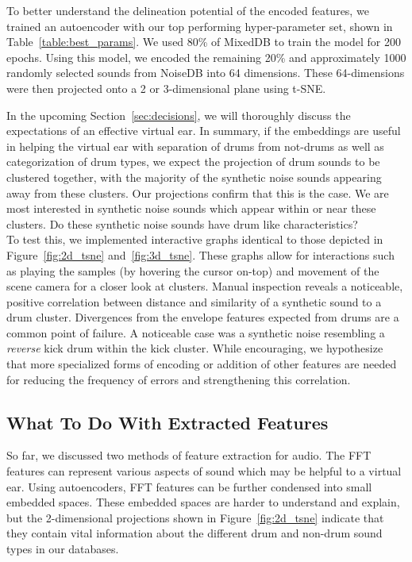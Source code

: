 \documentclass[\main/thesis.tex]{subfiles}
\begin{document}
To better understand the delineation potential of the encoded features,  we trained an autoencoder with our top performing hyper-parameter set, shown in Table~\ref{table:best_params}. We used 80\% of MixedDB to train the model for 200 epochs. Using this model, we encoded the remaining 20\% and approximately 1000 randomly selected sounds from NoiseDB into 64 dimensions. These 64-dimensions were then projected onto a 2 or 3-dimensional plane using t-SNE. 

In the upcoming Section~\ref{sec:decisions}, we will thoroughly discuss the expectations of an effective virtual ear. In summary, if the embeddings are useful in helping the virtual ear with separation of drums from not-drums as well as categorization of drum types, we expect the projection of drum sounds to be clustered together, with the majority of the synthetic noise sounds appearing away from these clusters. Our projections confirm that this is the case. We are most interested in synthetic noise sounds which appear within or near these clusters. Do these synthetic noise sounds have drum like characteristics?\\ 

To test this, we implemented interactive graphs identical to those depicted in Figure~\ref{fig:2d_tsne} and~\ref{fig:3d_tsne}. These graphs allow for interactions such as playing the samples (by hovering the cursor on-top) and movement of the scene camera for a closer look at clusters.  Manual inspection reveals a noticeable, positive correlation between distance and similarity of a synthetic sound to a drum cluster. Divergences from the envelope features expected from drums are a common point of failure. A noticeable case was a synthetic noise resembling a \emph{reverse} kick drum within the kick cluster. While encouraging, we hypothesize that more specialized forms of encoding or addition of other features are needed for reducing the frequency of errors and strengthening this correlation.
\subsection{What To Do With Extracted Features}
\label{sec:howto_use_features}
So far, we discussed two methods of feature extraction for audio. The FFT features can represent various aspects of sound which may be helpful to a virtual ear. Using autoencoders, FFT features can be further condensed into small embedded spaces. These embedded spaces are harder to understand and explain, but the 2-dimensional projections shown in Figure~\ref{fig:2d_tsne}  indicate that they contain vital information about the different drum and non-drum sound types in our databases. 
\end{document}
